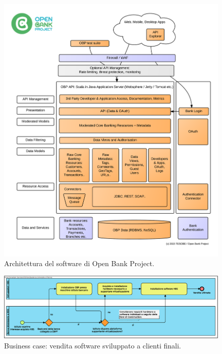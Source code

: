 \documentclass[10pt]{softeng} %
\begin{document}
\begin{figure}[tp]
	\centering
	\includegraphics[width=\textwidth]{open_bank_project_architecture}
	\caption{Architettura del software di Open Bank Project\cite{obparch}.}
	\label{fig:open_bank_project_architecture}
\end{figure}

\begin{figure}[hbt]
	\centering
	\includegraphics[width=\textheight, angle=90]{Images/Home_Banking_software_sale.eps}
	\caption{Business case: vendita software sviluppato a clienti finali.}
	\label{fig:business_case_vendita_software}
\end{figure}
\end{document}

